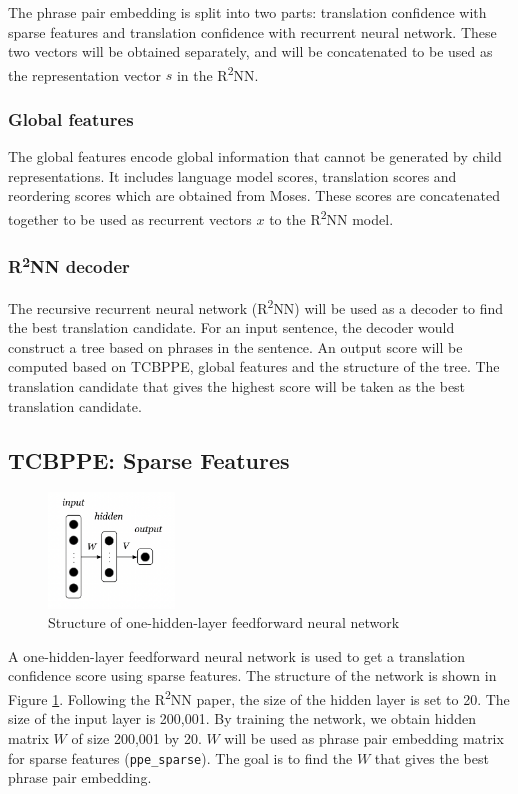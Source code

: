 \documentclass[12pt,a4paper,twoside,openright]{report}
\begin{document}
The phrase pair embedding is split into two parts: translation confidence with sparse features and translation confidence with recurrent neural network. These two vectors will be obtained separately, and will be concatenated to be used as the representation vector $s$ in the R\textsuperscript{2}NN.

\subsubsection{Global features}
The global features encode global information that cannot be generated by child representations. It includes language model scores, translation scores and reordering scores which are obtained from Moses. These scores are concatenated together to be used as recurrent vectors $x$ to the R\textsuperscript{2}NN model.

\subsubsection{R\textsuperscript{2}NN decoder}
The recursive recurrent neural network (R\textsuperscript{2}NN) will be used as a decoder to find the best translation candidate. For an input sentence, the decoder would construct a tree based on phrases in the sentence. An output score will be computed based on TCBPPE, global features and the structure of the tree. The translation candidate that gives the highest score will be taken as the best translation candidate.

\subsection{TCBPPE: Sparse Features} \label{TCBPPE_sparse}

\begin{figure}[ht]
\centering
\includegraphics[width=0.3\textwidth]{images/one_hidden_layer.png}
\caption{Structure of one-hidden-layer feedforward neural network}
\label{fig:one_hidden_layer}
\end{figure}

A one-hidden-layer feedforward neural network is used to get a translation confidence score using sparse features. The structure of the network is shown in Figure \ref{fig:one_hidden_layer}. Following the R\textsuperscript{2}NN paper\cite{r2nn}, the size of the hidden layer is set to 20. The size of the input layer is 200,001. By training the network, we obtain hidden matrix $W$ of size 200,001 by 20. $W$ will be used as phrase pair embedding matrix for sparse features (\texttt{ppe\_sparse}). The goal is to find the $W$ that gives the best phrase pair embedding.
\end{document}
